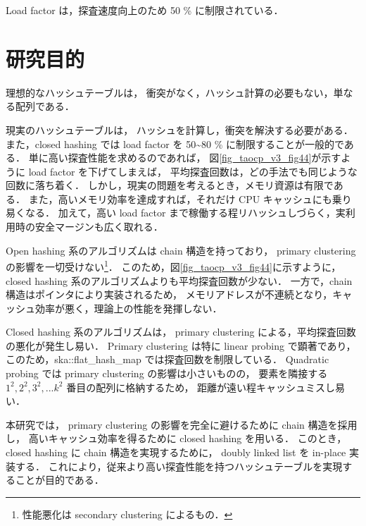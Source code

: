 Load factor は，探査速度向上のため 50 \% に制限されている．

\section{研究目的}
理想的なハッシュテーブルは，
衝突がなく，ハッシュ計算の必要もない，単なる配列である．

現実のハッシュテーブルは，
ハッシュを計算し，衝突を解決する必要がある．
また，closed hashing では load factor を 50\textasciitilde 80 \% に制限することが一般的である．
単に高い探査性能を求めるのであれば，
図\ref{fig_taocp_v3_fig44}が示すように load factor を下げてしまえば，
平均探査回数は，どの手法でも同じような回数に落ち着く．
しかし，現実の問題を考えるとき，メモリ資源は有限である．
また，高いメモリ効率を達成すれば，それだけ CPU キャッシュにも乗り易くなる．
加えて，高い load factor まで稼働する程リハッシュしづらく，実利用時の安全マージンも広く取れる．

Open hashing 系のアルゴリズムは chain 構造を持っており，
primary clustering の影響を一切受けない\footnote{性能悪化は secondary clustering によるもの．}．
このため，図\ref{fig_taocp_v3_fig44}に示すように，
closed hashing 系のアルゴリズムよりも平均探査回数が少ない．
一方で，chain 構造はポインタにより実装されるため，
メモリアドレスが不連続となり，キャッシュ効率が悪く，理論上の性能を発揮しない．

Closed hashing 系のアルゴリズムは，
primary clustering による，平均探査回数の悪化が発生し易い．
Primary clustering は特に linear probing で顕著であり，
このため，ska::flat\_hash\_map では探査回数を制限している．
Quadratic probing では primary clustering の影響は小さいものの，
要素を隣接する $1^2, 2^2, 3^2, ... k^2$ 番目の配列に格納するため，
距離が遠い程キャッシュミスし易い．

本研究では，
primary clustering の影響を完全に避けるために chain 構造を採用し，
高いキャッシュ効率を得るために closed hashing を用いる．
このとき，closed hashing に chain 構造を実現するために，
doubly linked list を in-place 実装する．
これにより，従来より高い探査性能を持つハッシュテーブルを実現することが目的である．



